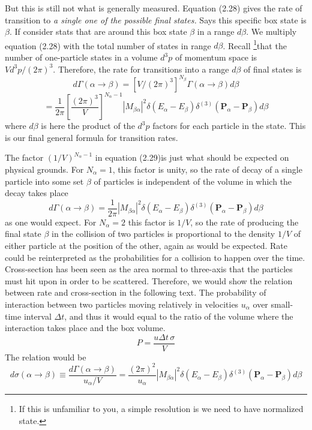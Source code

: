 \documentclass[12pt]{article}
\numberwithin{equation}{section}
\begin{document}
But this is still not what is generally measured.
Equation (2.28) gives the rate of transition to \textit{a single one of the possible final states.}
Says this specific box state is $\beta$. 
If consider stats that are around this box state $\beta$ in a range $d\beta$.
We multiply equation (2.28) with the total number of states in range $d\beta$.
Recall \footnote{If this is unfamiliar to you, a simple resolution is we need to have normalized state.}that the number of one-particle states in a volume $d^3p$ of momentum space is $Vd^3p/(2\pi)^3$.
Therefore, the rate for transitions into a range $d\beta$ of final states is 
\[d\Gamma(\alpha\rightarrow\beta) = [V/(2\pi)^3]^{N_{\beta}}\Gamma(\alpha\rightarrow\beta)d\beta\]
\begin{equation}
    =\frac{1}{2\pi}\left[\frac{(2\pi)^3}{V}\right]^{N_{\alpha}-1}\left|M_{\beta\alpha}\right|^{2}\delta(E_{\alpha}-E_{\beta})\delta^{(3)}(\mathbf{P}_{\alpha}-\mathbf{P}_{\beta})d\beta
\end{equation}
where $d\beta$ is here the product of the $d^3p$ factors for each particle in the state.
This is our final general formula for transition rates.

The factor $(1/V)^{N_{\alpha}-1}$ in equation (2.29)is just what should be expected on physical grounds.
For $N_{\alpha} = 1$, this factor is unity, so the rate of decay of a single particle into some set $\beta$ of particles is independent of the volume in which the decay takes place
\begin{equation}
    d\Gamma(\alpha\rightarrow\beta) = \frac{1}{2\pi}\left|M_{\beta\alpha}\right|^{2}\delta(E_{\alpha}-E_{\beta})\delta^{(3)}(\mathbf{P}_{\alpha}-\mathbf{P}_{\beta})d\beta
\end{equation}
as one would expect.
For $N_{\alpha} = 2$ this factor is $1/V$, so the rate of producing the final state $\beta$ in the collision of two particles is proportional to the density $1/V$ of either particle at the position of the other, again as would be expected.
Rate could be reinterpreted as the probabilities for a collision to happen over the time.
Cross-section has been seen as the area normal to three-axis that the particles must hit upon in order to be scattered.
Therefore, we would show the relation between rate and cross-section in the following text.
The probability of interaction between two particles moving relatively in velocities $u_{\alpha}$ over small-time interval $\Delta t$, and thus it would equal to the ratio of the volume where the interaction takes place and the box volume.
\[P = \frac{u\Delta t\,\sigma}{V}\]
The relation would be
\begin{equation}
    d\sigma(\alpha\rightarrow\beta)\equiv\frac{d\Gamma(\alpha\rightarrow\beta)}{u_{\alpha}/V} = \frac{(2\pi)^2}{u_{\alpha}}\left|M_{\beta\alpha}\right|^2\delta(E_{\alpha}-E_{\beta})\delta^{(3)}(\mathbf{P}_{\alpha}-\mathbf{P}_{\beta})d\beta
\end{equation}
\end{document}
